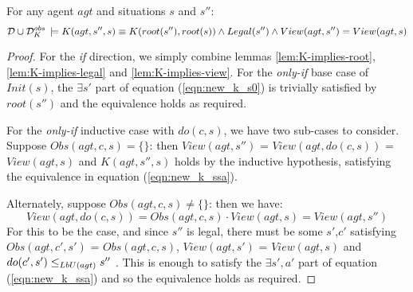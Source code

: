 \begin{thmext}
[{{[}{\ref{thm:k_obs_equiv}}]}] For any agent $agt$ and situations
$s$ and $s''$:\[
\mathcal{D}\cup\mathcal{D}_{K}^{obs}\,\models K(agt,s'',s)\equiv K(root(s''),root(s))\wedge Legal(s'')\wedge View(agt,s'')=View(agt,s)\]

\end{thmext}
\begin{proof}
For the \emph{if} direction, we simply combine lemmas \ref{lem:K-implies-root},
\ref{lem:K-implies-legal} and \ref{lem:K-implies-view}. For the
\emph{only-if} base case of $Init(s)$, the $\exists s'$ part of
equation (\ref{eqn:new_k_s0}) is trivially satisfied by $root(s'')$
and the equivalence holds as required.

For the \emph{only-if} inductive case with $do(c,s)$, we have two
sub-cases to consider. Suppose $Obs(agt,c,s)=\{\}$: then $View(agt,s'')$
= $View(agt,do(c,s))$ = $View(agt,s)$ and $K(agt,s'',s)$ holds
by the inductive hypothesis, satisfying the equivalence in equation
(\ref{eqn:new_k_ssa}).

Alternately, suppose $Obs(agt,c,s)\neq\{\}$: then we have:\[
View(agt,do(c,s))=Obs(agt,c,s)\cdot View(agt,s)=View(agt,s'')\]
 For this to be the case, and since $s''$ is legal, there must be
some $s'$,$c'$ satisfying $Obs(agt,c',s')$ = $Obs(agt,c,s)$, $View(agt,s')$
= $View(agt,s)$ and $do(c',s')\leq_{LbU(agt)}s''$ . This is enough
to satisfy the $\exists s',a'$ part of equation (\ref{eqn:new_k_ssa})
and so the equivalence holds as required. 
\end{proof}
\medskip{}


